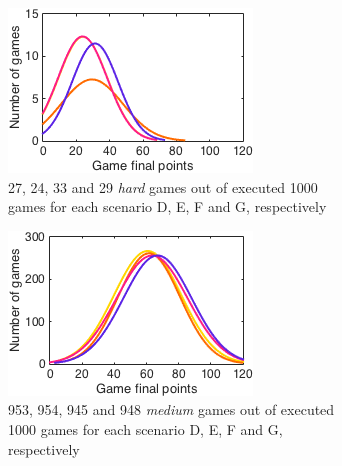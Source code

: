 \begin{figure}[h]
        \centering
        \begin{subfigure}[h]{0.32\textwidth}
                \includegraphics[width=\textwidth]{./img/4/DEFGhard}
                \caption{27, 24, 33 and 29 \emph{hard} games out of executed 1000 games for each scenario D, E, F and G, respectively}
                \label{fig:DEFGhard}
        \end{subfigure}
        \begin{subfigure}[h]{0.32\textwidth}
                \includegraphics[width=\textwidth]{./img/4/DEFGmedium}
                \caption{953, 954, 945 and 948 \emph{medium} games out of executed 1000 games for each scenario D, E, F and G, respectively}
                \label{fig:DEFGmedium}
        \end{subfigure}
        \begin{subfigure}[h]{0.32\textwidth}

\end{subfigure}
\end{figure}

